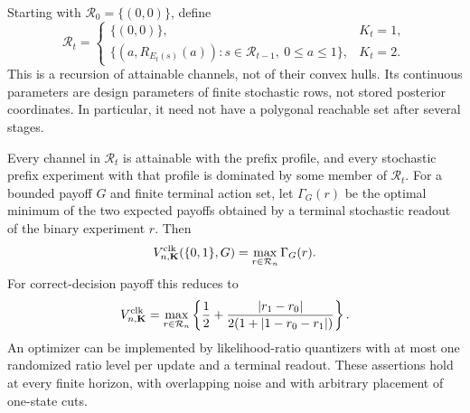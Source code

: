 Starting with $\mathcal R_0=\{(0,0)\}$, define
\begin{equation}\label{eq:v23-minimax-recursion}
 \mathcal R_t=
 \begin{cases}
 \{(0,0)\},&K_t=1,\\
 \{(a,R_{E_t(s)}(a)):s\in\mathcal R_{t-1},\ 0\le a\le1\},&K_t=2.
 \end{cases}
\end{equation}
This is a recursion of attainable channels, not of their convex hulls.
Its continuous parameters are design parameters of finite stochastic
rows, not stored posterior coordinates. In particular, it need not
have a polygonal reachable set after several stages.

\begin{theorem}
\label{thm:v23-minimax-recursion}
Every channel in $\mathcal R_t$ is attainable with the prefix profile,
and every stochastic prefix experiment with that profile is dominated
by some member of $\mathcal R_t$. For a bounded payoff $G$ and finite
terminal action set, let $\Gamma_G(r)$ be the optimal minimum of the
two expected payoffs obtained by a terminal stochastic readout of the
binary experiment $r$. Then
\begin{equation}\label{eq:v23-general-minimax-recursion}
 V^{\rm clk}_{n,\mathbf K}(\{0,1\},G)
                              =\max_{r\in\mathcal R_n}\Gamma_G(r).
\end{equation}
For correct-decision payoff this reduces to
\begin{equation}\label{eq:v23-binary-terminal}
 V^{\rm clk}_{n,\mathbf K}
  =\max_{r\in\mathcal R_n}
   \left\{\frac12+
      \frac{|r_1-r_0|}{2(1+|1-r_0-r_1|)}\right\}.
\end{equation}
An optimizer can be implemented by likelihood-ratio quantizers with
at most one randomized ratio level per update and a terminal readout.
These assertions hold at every finite horizon, with overlapping noise
and with arbitrary placement of one-state cuts.
\end{theorem}

